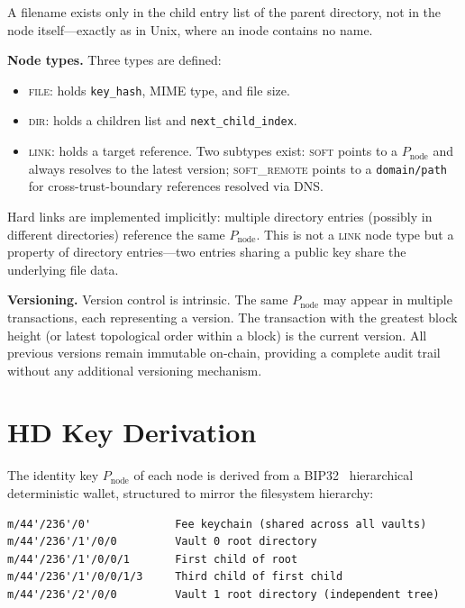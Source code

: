 \documentclass[11pt,a4paper]{article}
\begin{document}
A filename exists only in the child entry list of the parent directory, not in the node itself---exactly as in Unix, where an inode contains no name.

\textbf{Node types.} Three types are defined:
\begin{itemize}
\item \textsc{file}: holds \texttt{key\_hash}, MIME type, and file size.
\item \textsc{dir}: holds a children list and \texttt{next\_child\_index}.
\item \textsc{link}: holds a target reference. Two subtypes exist: \textsc{soft} points to a $P_{\text{node}}$ and always resolves to the latest version; \textsc{soft\_remote} points to a \texttt{domain/path} for cross-trust-boundary references resolved via DNS.
\end{itemize}

Hard links are implemented implicitly: multiple directory entries (possibly in different directories) reference the same $P_{\text{node}}$. This is not a \textsc{link} node type but a property of directory entries---two entries sharing a public key share the underlying file data.

\textbf{Versioning.} Version control is intrinsic. The same $P_{\text{node}}$ may appear in multiple transactions, each representing a version. The transaction with the greatest block height (or latest topological order within a block) is the current version. All previous versions remain immutable on-chain, providing a complete audit trail without any additional versioning mechanism.

\section{HD Key Derivation}

The identity key $P_{\text{node}}$ of each node is derived from a BIP32~\cite{bip32} hierarchical deterministic wallet, structured to mirror the filesystem hierarchy:

\begin{lstlisting}
m/44'/236'/0'             Fee keychain (shared across all vaults)
m/44'/236'/1'/0/0         Vault 0 root directory
m/44'/236'/1'/0/0/1       First child of root
m/44'/236'/1'/0/0/1/3     Third child of first child
m/44'/236'/2'/0/0         Vault 1 root directory (independent tree)
\end{lstlisting}
\end{document}
